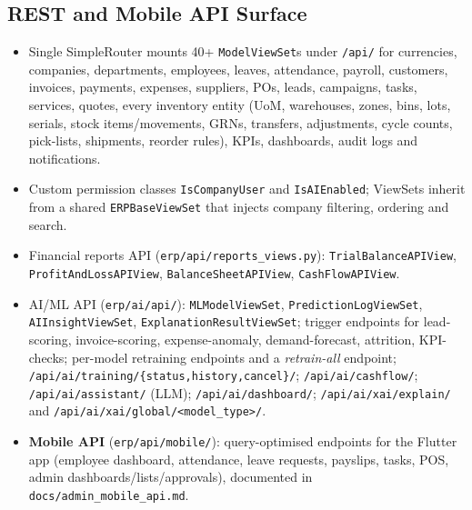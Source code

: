 \documentclass[12pt,a4paper]{report}
\begin{document}
\subsection{REST and Mobile API Surface}
\begin{itemize}
  \item Single SimpleRouter mounts 40+ \texttt{ModelViewSet}s under \texttt{/api/} for currencies, companies, departments, employees, leaves, attendance, payroll, customers, invoices, payments, expenses, suppliers, POs, leads, campaigns, tasks, services, quotes, every inventory entity (UoM, warehouses, zones, bins, lots, serials, stock items/movements, GRNs, transfers, adjustments, cycle counts, pick-lists, shipments, reorder rules), KPIs, dashboards, audit logs and notifications.
  \item Custom permission classes \texttt{IsCompanyUser} and \texttt{IsAIEnabled}; ViewSets inherit from a shared \texttt{ERPBaseViewSet} that injects company filtering, ordering and search.
  \item Financial reports API (\texttt{erp/api/reports\_views.py}): \texttt{TrialBalanceAPIView}, \texttt{ProfitAndLossAPIView}, \texttt{BalanceSheetAPIView}, \texttt{CashFlowAPIView}.
  \item AI/ML API (\texttt{erp/ai/api/}): \texttt{MLModelViewSet}, \texttt{PredictionLogViewSet}, \texttt{AIInsightViewSet}, \texttt{ExplanationResultViewSet}; trigger endpoints for lead-scoring, invoice-scoring, expense-anomaly, demand-forecast, attrition, KPI-checks; per-model retraining endpoints and a \emph{retrain-all} endpoint; \texttt{/api/ai/training/\{status,history,cancel\}/}; \texttt{/api/ai/cashflow/}; \texttt{/api/ai/assistant/} (LLM); \texttt{/api/ai/dashboard/}; \texttt{/api/ai/xai/explain/} and \texttt{/api/ai/xai/global/<model\_type>/}.
  \item \textbf{Mobile API} (\texttt{erp/api/mobile/}): query-optimised endpoints for the Flutter app (employee dashboard, attendance, leave requests, payslips, tasks, POS, admin dashboards/lists/approvals), documented in \texttt{docs/admin\_mobile\_api.md}.
\end{itemize}
\end{document}

